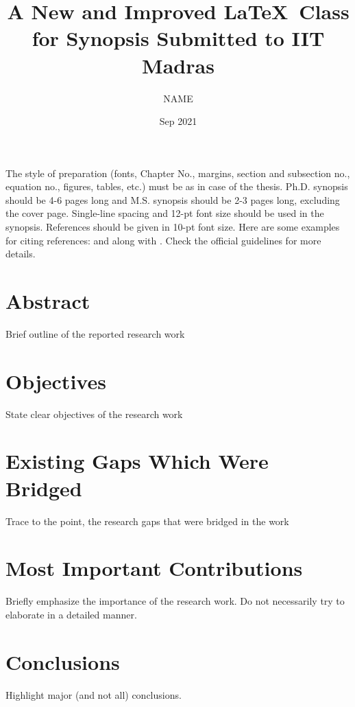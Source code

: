 \documentclass[MS,synopsis]{iitmdiss}
\title{A New and Improved \LaTeX\ Class for Synopsis Submitted to IIT Madras}
\author{NAME}
\date{Sep 2021}
\begin{document}
\maketitle
\restoregeometry

\setcounter{page}{1}

\singlespacing

The style of preparation (fonts, Chapter No., margins, section and subsection no.,
equation no., figures, tables, etc.) must be as in case of the thesis. Ph.D. synopsis should be 4-6 pages long and M.S. synopsis should be 2-3 pages
long, excluding the cover page. Single-line spacing and 12-pt font size should be used in the synopsis. References should be given in 10-pt font size. Here are some examples for citing references: \cite{lamport:86} and \cite{Ahren2005} along with \cite{Roenby2016}. Check the official guidelines for more details.

\section{Abstract}
Brief outline of the reported research work

\section{Objectives}
State clear objectives of the research work

\section{Existing Gaps Which Were Bridged}
Trace to the point, the research gaps that were bridged in the work

\section{Most Important Contributions}
Briefly emphasize the importance of the research work. Do not necessarily try to elaborate in a detailed manner.

\section{Conclusions}
Highlight major (and not all) conclusions.
\end{document}
